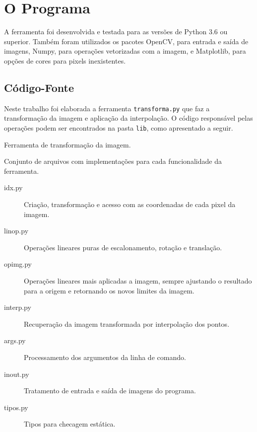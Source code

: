 \section{O Programa} \label{sec:programa}


A ferramenta foi desenvolvida e testada para as versões de Python 3.6 ou superior. Também foram utilizados os pacotes OpenCV, para entrada e saída de imagens, Numpy, para operações vetorizadas com a imagem, e Matplotlib, para opções de cores para pixels inexistentes.

\subsection{Código-Fonte}

    Neste trabalho foi elaborada a ferramenta \texttt{transforma.py} que faz a transformação da imagem e aplicação da interpolação. O código responsável pelas operações podem ser encontrados na pasta \texttt{lib}, como apresentado a seguir.

    \begin{description}[leftmargin = 1.5em]

        \item[transforma.py] Ferramenta de transformação da imagem.

        \item[lib] Conjunto de arquivos com implementações para cada funcionalidade da ferramenta.

        \begin{description}

            \item[idx.py] Criação, transformação e acesso com as coordenadas de cada pixel da imagem.

            \item[linop.py] Operações lineares puras de escalonamento, rotação e translação.

            \item[opimg.py] Operações lineares mais aplicadas a imagem, sempre ajustando o resultado para a origem e retornando os novos limites da imagem.

            \item[interp.py] Recuperação da imagem transformada por interpolação dos pontos.

            \item[args.py] Processamento dos argumentos da linha de comando.

            \item[inout.py] Tratamento de entrada e saída de imagens do programa.

            \item[tipos.py] Tipos para checagem estática.
        \end{description}
    \end{description}

